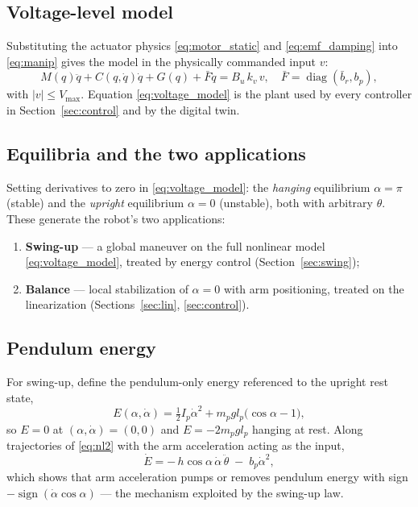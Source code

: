 \documentclass[conference]{IEEEtran}
\newcommand{\sign}{\operatorname{sign}}
\newcommand{\diag}{\operatorname{diag}}
\begin{document}
\subsection{Voltage-level model}
Substituting the actuator physics \eqref{eq:motor_static} and \eqref{eq:emf_damping} into \eqref{eq:manip} gives the model in the physically commanded input $v$:
\begin{equation}
M(q)\ddot q + C(q,\dot q)\dot q + G(q) + \bar F\dot q = B_u\,k_v\,v,
\quad \bar F = \diag(\bar b_r, b_p),
\label{eq:voltage_model}
\end{equation}
with $|v|\le V_{\max}$. Equation \eqref{eq:voltage_model} is the plant used by every controller in Section~\ref{sec:control} and by the digital twin.

\subsection{Equilibria and the two applications}
Setting derivatives to zero in \eqref{eq:voltage_model}: the \emph{hanging} equilibrium $\alpha = \pi$ (stable) and the \emph{upright} equilibrium $\alpha = 0$ (unstable), both with arbitrary $\theta$. These generate the robot's two applications:
\begin{enumerate}[label=(\alph*)]
\item \textbf{Swing-up} --- a global maneuver on the full nonlinear model \eqref{eq:voltage_model}, treated by energy control (Section~\ref{sec:swing});
\item \textbf{Balance} --- local stabilization of $\alpha=0$ with arm positioning, treated on the linearization (Sections~\ref{sec:lin}, \ref{sec:control}).
\end{enumerate}

\subsection{Pendulum energy}
For swing-up, define the pendulum-only energy referenced to the upright rest state,
\begin{equation}
E(\alpha,\dot\alpha) = \tfrac12 I_p\dot\alpha^2 + m_p g l_p\bigl(\cos\alpha - 1\bigr),
\label{eq:energy}
\end{equation}
so $E = 0$ at $(\alpha,\dot\alpha)=(0,0)$ and $E = -2m_p g l_p$ hanging at rest. Along trajectories of \eqref{eq:nl2} with the arm acceleration acting as the input,
\begin{equation}
\dot E = -\,h\cos\alpha\,\dot\alpha\,\ddot\theta \;-\; b_p\dot\alpha^2 ,
\label{eq:Edot}
\end{equation}
which shows that arm acceleration pumps or removes pendulum energy with sign $-\sign(\dot\alpha\cos\alpha)$ --- the mechanism exploited by the swing-up law.
\end{document}
